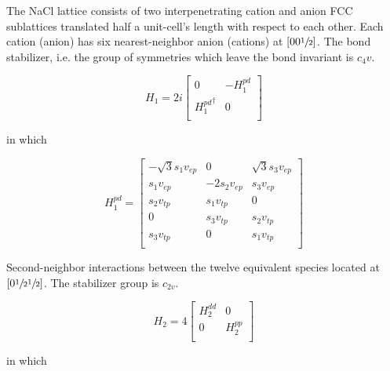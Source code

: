 \documentclass[preprint,showpacs,preprintnumbers,superscriptaddress,prb,floatfix,aps]{revtex4-1}
\begin{document}
The NaCl lattice consists of two interpenetrating cation and anion FCC sublattices translated half a unit-cell's length with respect to each other. Each cation (anion) has six nearest-neighbor anion (cations) at $\left[0 0 \sfrac{1}{2}\right]$. The bond stabilizer, i.e. the group of symmetries which leave the bond invariant is $c_4v$.


\begin{equation}
H_1 = 2i
\begin{bmatrix}
0                  & -H_1^{pd} \\
{H_1^{pd}}^\dagger &  0        \\
\end{bmatrix}
\end{equation}

in which 

\begin{equation}
H_1^{pd} = 
\begin{bmatrix}
-\sqrt{3} s_1 v_{ep} & 0            & \sqrt{3} s_3 v_{ep}  \\ %
 s_1 v_{ep}          &-2 s_2 v_{ep} &  s_3 v_{ep}          \\ %
 s_2 v_{tp}          &  s_1 v_{tp}  & 0                    \\
0                    &  s_3 v_{tp}  &  s_2 v_{tp}          \\
 s_3 v_{tp}          & 0            &  s_1 v_{tp}          \\
\end{bmatrix}
\end{equation}

Second-neighbor interactions between the twelve equivalent species located at $\left[0\sfrac{1}{2}\sfrac{1}{2}\right]$. The stabilizer group is $c_{2v}$.


\begin{equation}
H_2 = 4
\begin{bmatrix}
H_2^{dd} & 0 \\
 0 & H_2^{pp} \\
\end{bmatrix}
\end{equation}

in which
\end{document}
